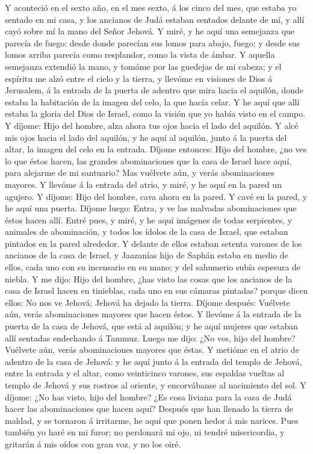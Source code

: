  Y aconteció en el sexto año, en el mes sexto, á los cinco
del mes, que estaba yo sentado en mi casa, y los ancianos de Judá
estaban sentados delante de mí, y allí cayó sobre mí la mano del Señor
Jehová.  Y miré, y he aquí una semejanza que parecía de
fuego: desde donde parecían sus lomos para abajo, fuego; y desde sus
lomos arriba parecía como resplandor, como la vista de ámbar.
 Y aquella semejanza extendió la mano, y tomóme por las
guedejas de mi cabeza; y el espíritu me alzó entre el cielo y la tierra,
y llevóme en visiones de Dios á Jerusalem, á la entrada de la puerta de
adentro que mira hacia el aquilón, donde estaba la habitación de la
imagen del celo, la que hacía celar.  Y he aquí que allí
estaba la gloria del Dios de Israel, como la visión que yo había visto
en el campo.  Y díjome: Hijo del hombre, alza ahora tus
ojos hacia el lado del aquilón. Y alcé mis ojos hacia el lado del
aquilón, y he aquí al aquilón, junto á la puerta del altar, la imagen
del celo en la entrada.  Díjome entonces: Hijo del hombre,
¿no ves lo que éstos hacen, las grandes abominaciones que la casa de
Israel hace aquí, para alejarme de mi santuario? Mas vuélvete aún, y
verás abominaciones mayores.  Y llevóme á la entrada del
atrio, y miré, y he aquí en la pared un agujero.  Y
díjome: Hijo del hombre, cava ahora en la pared. Y cavé en la pared, y
he aquí una puerta.  Díjome luego: Entra, y ve las
malvadas abominaciones que éstos hacen allí.  Entré pues,
y miré, y he aquí imágenes de todas serpientes, y animales de
abominación, y todos los ídolos de la casa de Israel, que estaban
pintados en la pared alrededor.  Y delante de ellos
estaban setenta varones de los ancianos de la casa de Israel, y
Jaazanías hijo de Saphán estaba en medio de ellos, cada uno con su
incensario en su mano; y del sahumerio subía espesura de niebla.
 Y me dijo: Hijo del hombre, ¿has visto las cosas que los
ancianos de la casa de Israel hacen en tinieblas, cada uno en sus
cámaras pintadas? porque dicen ellos: No nos ve Jehová; Jehová ha dejado
la tierra.  Díjome después: Vuélvete aún, verás
abominaciones mayores que hacen éstos.  Y llevóme á la
entrada de la puerta de la casa de Jehová, que está al aquilón; y he
aquí mujeres que estaban allí sentadas endechando á Tammuz.
 Luego me dijo: ¿No ves, hijo del hombre? Vuélvete aún,
verás abominaciones mayores que éstas.  Y metióme en el
atrio de adentro de la casa de Jehová: y he aquí junto á la entrada del
templo de Jehová, entre la entrada y el altar, como veinticinco varones,
sus espaldas vueltas al templo de Jehová y sus rostros al oriente, y
encorvábanse al nacimiento del sol.  Y díjome: ¿No has
visto, hijo del hombre? ¿Es cosa liviana para la casa de Judá hacer las
abominaciones que hacen aquí? Después que han llenado la tierra de
maldad, y se tornaron á irritarme, he aquí que ponen hedor á mis
narices.  Pues también yo haré en mi furor; no perdonará
mi ojo, ni tendré misericordia, y gritarán á mis oídos con gran voz, y
no los oiré.

